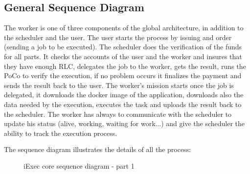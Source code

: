     \subsection{General Sequence Diagram}
        The worker is one of three components of the global architecture, in addition to the scheduler and the user.
        The user starts the process by issuing and order (sending a job to be executed). The scheduler does the verification
        of the funds for all parts. It checks the accounts of the user and the worker and insures that they have enough RLC,
        delegates the job to the worker, gets the result, runs the PoCo to verify the execution, if no problem occurs it
        finalizes the payment and sends the result back to the user. The worker's mission starts once the job is delegated,
        it downloads the docker image of the application, downloads also the data needed by the execution, executes the task
        and uploads the result back to the scheduler. The worker has always to communicate with the scheduler to update his
        status (alive, working, waiting for work...) and give the scheduler the ability to track the execution process.\newline

        The sequence diagram illustrates the details of all the process:
        
        \begin{figure}[p]
            \vspace*{-2cm}
            \caption{iExec core sequence diagram - part 1}
        \end{figure}

